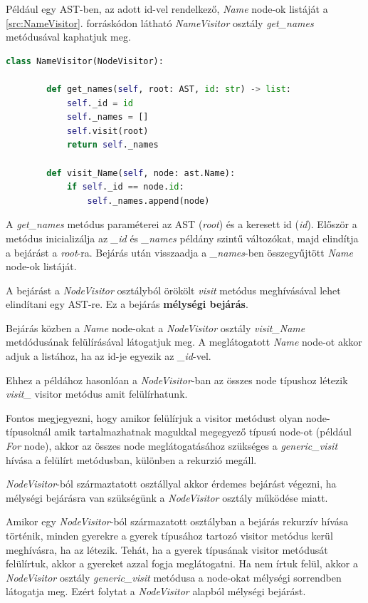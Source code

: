 Például egy AST-ben, az adott id-vel rendelkező, \emph{Name} node-ok listáját
a \ref{src:NameVisitor}. forráskódon látható \emph{NameVisitor} osztály
\emph{get\_names} metódusával kaphatjuk meg.

\begin{lstlisting}[language={Python}]
	class NameVisitor(NodeVisitor):
		
		def get_names(self, root: AST, id: str) -> list:
			self._id = id
			self._names = []
			self.visit(root)
			return self._names
		
		def visit_Name(self, node: ast.Name):
			if self._id == node.id:
				self._names.append(node)
\end{lstlisting}

A \emph{get\_names} metódus paraméterei az AST (\emph{root}) és a keresett id (\emph{id}).
Először a metódus inicializálja az \emph{\_id} és \emph{\_names} példány szintű változókat,
majd elindítja a bejárást a \emph{root}-ra.
Bejárás után visszaadja a \emph{\_names}-ben összegyűjtött \emph{Name} node-ok listáját.

A bejárást a \emph{NodeVisitor} osztályból örökölt \emph{visit} metódus meghívásával
lehet elindítani egy AST-re. Ez a bejárás \textbf{mélységi bejárás}.

Bejárás közben a \emph{Name} node-okat a \emph{NodeVisitor} osztály \emph{visit\_Name}
metdódusának felülírásával látogatjuk meg.
A meglátogatott \emph{Name} node-ot akkor adjuk a listához,
ha az id-je egyezik az \emph{\_id}-vel.

Ehhez a példához hasonlóan a \emph{NodeVisitor}-ban az összes node típushoz
létezik \emph{visit\_<node-class>} visitor metódus amit felülírhatunk.

Fontos megjegyezni, hogy amikor felülírjuk a visitor metódust olyan node-típusoknál
amik tartalmazhatnak magukkal megegyező típusú node-ot (például \emph{For} node),
akkor az összes node meglátogatásához szükséges a \emph{generic\_visit} hívása
a felülírt metódusban, különben a rekurzió megáll.

\emph{NodeVisitor}-ból származtatott osztállyal akkor érdemes bejárást végezni,
ha mélységi bejárásra van szükségünk a \emph{NodeVisitor} osztály működése miatt.

Amikor egy \emph{NodeVisitor}-ból származatott osztályban a bejárás rekurzív hívása történik,
minden gyerekre a gyerek típusához tartozó visitor metódus kerül meghívásra, ha az létezik.
Tehát, ha a gyerek típusának visitor metódusát felülírtuk, akkor a gyereket azzal fogja meglátogatni.
Ha nem írtuk felül, akkor a \emph{NodeVisitor} osztály
\emph{generic\_visit} metódusa a node-okat mélységi sorrendben látogatja meg.
Ezért folytat a \emph{NodeVisitor} alapból mélységi bejárást.


